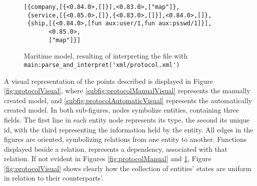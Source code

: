 \begin{figure}[h]
  \begin{lstlisting}[keywordstyle={}]
[{company,[{<0.84.0>,[]}],<0.83.0>,["map"]},
 {service,[{<0.85.0>,[]},{<0.83.0>,[]}],<0.84.0>,[]},
 {ship,[{<0.84.0>,[fun aux:user/1,fun aux:psswd/1]}],
       <0.85.0>,
       ["map"]}]
  \end{lstlisting}
  \caption{Maritime model, resulting of interpreting the file  with \lstinline{main:parse_and_interpret('xml/protocol.xml')}}
  \label{fig:protocolAutomatic}
\end{figure}

\noindent
A visual representation of the points described is displayed in Figure \ref{fig:protocolVisual}, where \ref{subfig:protocolManualVisual} represents the manually created model, and \ref{subfig:protocolAutomaticVisual} represents the automatically created model. In both sub-figures, nodes symbolize entities, containing three fields. The first line in each entity node represents its type, the second its unique id, with the third representing the information held by the entity. All edges in the figures are oriented, symbolizing relations from one entity to another. Functions displayed beside a relation, represents a dependency, associated with that relation. If not evident in Figures \ref{fig:protocolManual} and \ref{fig:protocolAutomatic}, Figure \ref{fig:protocolVisual} shows clearly how the collection of entities' states are uniform in relation to their counterparts'.

